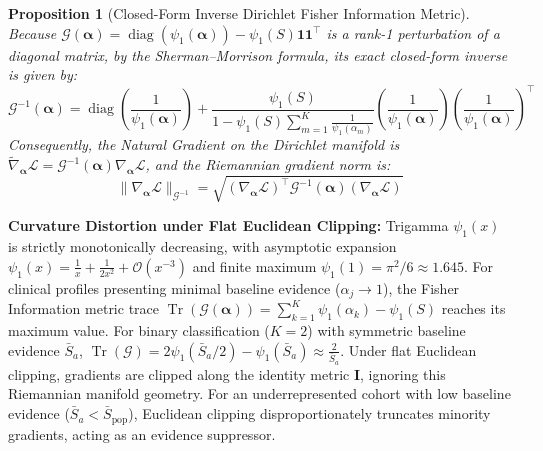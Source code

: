 \documentclass[pdflatex,sn-vancouver-num,referee,lineno]{sn-jnl}
\theoremstyle{thmstyleone}
\newtheorem{proposition}[theorem]{Proposition}
\theoremstyle{thmstylethree}
\begin{document}
\begin{proposition}[Closed-Form Inverse Dirichlet Fisher Information Metric]
\label{prop:inverse_fisher}
Because $\mathcal{G}(\boldsymbol{\alpha}) = \operatorname{diag}(\psi_1(\boldsymbol{\alpha})) - \psi_1(S) \mathbf{1}\mathbf{1}^\top$ is a rank-1 perturbation of a diagonal matrix, by the Sherman--Morrison formula, its exact closed-form inverse is given by:
\begin{equation}
    \mathcal{G}^{-1}(\boldsymbol{\alpha}) = \operatorname{diag}\left(\frac{1}{\psi_1(\boldsymbol{\alpha})}\right) + \frac{\psi_1(S)}{1 - \psi_1(S) \sum_{m=1}^K \frac{1}{\psi_1(\alpha_m)}} \left(\frac{1}{\psi_1(\boldsymbol{\alpha})}\right) \left(\frac{1}{\psi_1(\boldsymbol{\alpha})}\right)^\top
\end{equation}
Consequently, the Natural Gradient on the Dirichlet manifold is $\widetilde{\nabla}_{\boldsymbol{\alpha}} \mathcal{L} = \mathcal{G}^{-1}(\boldsymbol{\alpha}) \nabla_{\boldsymbol{\alpha}} \mathcal{L}$, and the Riemannian gradient norm is:
\begin{equation}
    \|\nabla_{\boldsymbol{\alpha}} \mathcal{L}\|_{\mathcal{G}^{-1}} = \sqrt{(\nabla_{\boldsymbol{\alpha}} \mathcal{L})^\top \mathcal{G}^{-1}(\boldsymbol{\alpha}) (\nabla_{\boldsymbol{\alpha}} \mathcal{L})}
\end{equation}
\end{proposition}\noindent \textbf{Curvature Distortion under Flat Euclidean Clipping:} Trigamma $\psi_1(x)$ is strictly monotonically decreasing, with asymptotic expansion $\psi_1(x) = \frac{1}{x} + \frac{1}{2x^2} + \mathcal{O}(x^{-3})$ and finite maximum $\psi_1(1) = \pi^2/6 \approx 1.645$. For clinical profiles presenting minimal baseline evidence ($\alpha_j \to 1$), the Fisher Information metric trace $\operatorname{Tr}(\mathcal{G}(\boldsymbol{\alpha})) = \sum_{k=1}^K \psi_1(\alpha_k) - \psi_1(S)$ reaches its maximum value. For binary classification ($K=2$) with symmetric baseline evidence $\bar{S}_a$, $\operatorname{Tr}(\mathcal{G}) = 2\psi_1(\bar{S}_a/2) - \psi_1(\bar{S}_a) \approx \frac{2}{\bar{S}_a}$. Under flat Euclidean clipping, gradients are clipped along the identity metric $\mathbf{I}$, ignoring this Riemannian manifold geometry. For an underrepresented cohort with low baseline evidence ($\bar{S}_a < \bar{S}_{\text{pop}}$), Euclidean clipping disproportionately truncates minority gradients, acting as an evidence suppressor.
\end{document}
